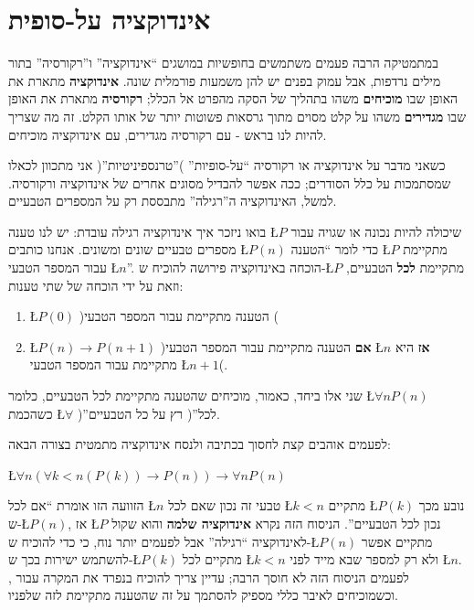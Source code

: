 \documentclass[english,hebrew]{article}
\begin{document}
\section*{אינדוקציה על-סופית}

במתמטיקה הרבה פעמים משתמשים בחופשיות במושגים \textquotedblleft אינדוקציה\textquotedblright{}
ו\textquotedblright רקורסיה\textquotedblright{} בתור מילים נרדפות,
אבל עמוק בפנים יש להן משמעות פורמלית שונה. \textbf{אינדוקציה} מתארת
את האופן שבו \textbf{מוכיחים} משהו בתהליך של הסקה מהפרט אל הכלל; \textbf{רקורסיה}
מתארת את האופן שבו \textbf{מגדירים} משהו על קלט מסוים מתוך גרסאות
פשוטות יותר של אותו הקלט. זה מה שצריך להיות לנו בראש - עם רקורסיה
מגדירים, עם אינדוקציה מוכיחים.

כשאני מדבר על אינדוקציה או רקורסיה \textquotedblleft על-סופיות\textquotedblright{}
)\textquotedblright טרנספיניטיות\textquotedblright ( אני מתכוון לכאלו
שמסתמכות על כלל הסודרים; ככה אפשר להבדיל מסוגים אחרים של אינדוקציה
ורקורסיה. למשל, האינדוקציה ה\textquotedblright רגילה\textquotedblright{}
מתבססת רק על המספרים הטבעיים.

בואו ניזכר איך אינדוקציה רגילה עובדת: יש לנו טענה \L{$P$} שיכולה
להיות נכונה או שגויה עבור מספרים טבעיים שונים ומשונים. אנחנו כותבים
\L{$P\left(n\right)$} כדי לומר \textquotedblleft הטענה \L{$P$} מתקיימת
עבור המספר הטבעי \L{$n$}\textquotedblright . הוכחה באינדוקציה פירושה
להוכיח ש-\L{$P$} מתקיימת \textbf{לכל} הטבעיים, וזאת על ידי הוכחה
של שתי טענות:
\begin{enumerate}
\item \L{$P\left(0\right)$} )הטענה מתקיימת עבור המספר הטבעי {\endL}(
\item \L{$P\left(n\right)\to P\left(n+1\right)$} )\textbf{אם} הטענה מתקיימת
עבור המספר הטבעי \L{$n$} \textbf{אז} היא מתקיימת עבור המספר הטבעי
\L{$n+1$}(.
\end{enumerate}
שני אלו ביחד, כאמור, מוכיחים שהטענה מתקיימת לכל הטבעיים, כלומר \L{$\forall nP\left(n\right)$}
כשהכמת \L{$\forall$} )\textquotedblright לכל\textquotedblright (
רץ על כל הטבעיים.

לפעמים אוהבים קצת לחסוך בכתיבה ולנסח אינדוקציה מתמטית בצורה הבאה:

\L{$\forall n\left(\forall k<n\left(P\left(k\right)\right)\to P\left(n\right)\right)\to\forall nP\left(n\right)$}

הזוועה הזו אומרת \textquotedblleft אם לכל \L{$n$} טבעי זה נכון שאם
לכל \L{$k<n$} מתקיים \L{$P\left(k\right)$} נובע מכך ש-\L{$P\left(n\right)$},
אז \L{$P$} נכון לכל הטבעיים\textquotedblright . הניסוח הזה נקרא \textbf{אינדוקציה
שלמה} והוא שקול לאינדוקציה \textquotedblleft רגילה\textquotedblright{}
אבל לפעמים יותר נוח, כי כדי להוכיח ש-\L{$P\left(n\right)$} מתקיים
אפשר להשתמש ישירות בכך ש-\L{$P\left(k\right)$} מתקיים לכל \L{$k<n$}
ולא רק למספר שבא מייד לפני \L{$n$}. לפעמים הניסוח הזה לא חוסך הרבה;
עדיין צריך להוכיח בנפרד את המקרה עבור {\endL}, וכשמוכיחים
לאיבר כללי מספיק להסתמך על זה שהטענה מתקיימת לזה שלפניו.
\end{document}
